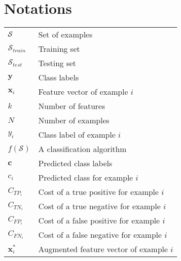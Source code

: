 
\chapter{Notations}
	
\begin{tabularx}{\textwidth}{ l X }
$\cal S$ 		& Set of examples 		\dotfill \pageref{ntn:ch2:1} \\ 
$\mathcal{S}_{train}$ 	& Training set	 		\dotfill \pageref{ntn:ch2:1} \\
$\mathcal{S}_{test}$ 	& Testing set	 		\dotfill \pageref{ntn:ch2:1} \\
$\mathbf{y}$ 		& Class labels 			\dotfill \pageref{ntn:ch2:1} \\  
$\mathbf{x}_i$ 		& Feature vector of example $i$ \dotfill \pageref{ntn:ch2:1} \\
$k$ 			& Number of features 		\dotfill \pageref{ntn:ch2:1} \\
$N $ 			& Number of examples 		\dotfill \pageref{ntn:ch2:1} \\
$y_i$ 			& Class label of example $i$ 	\dotfill \pageref{ntn:ch2:1} \\
$f(\mathcal{S})$ 	& A classification algorithm 	\dotfill \pageref{ntn:ch2:1} \\
$\mathbf{c}$ 		& Predicted class labels 	\dotfill \pageref{ntn:ch2:1} \\  
$c_i$ 			& Predicted class for example $i$  \dotfill \pageref{ntn:ch2:1} \\
$C_{TP_i}$		& Cost of a true positive for example $i$	\dotfill \pageref{ntn:ch2:2} \\
$C_{TN_i}$		& Cost of a true negative for example $i$	\dotfill \pageref{ntn:ch2:2} \\	
$C_{FP_i}$		& Cost of a false positive for example $i$	\dotfill \pageref{ntn:ch2:2} \\	
$C_{FN_i}$		& Cost of a false negative for example $i$	\dotfill \pageref{ntn:ch2:2} \\	
$\mathbf{x}_i^*$ 	& Augmented feature vector of example $i$ \dotfill \pageref{ntn:ch2:3} \\	
\end{tabularx}
